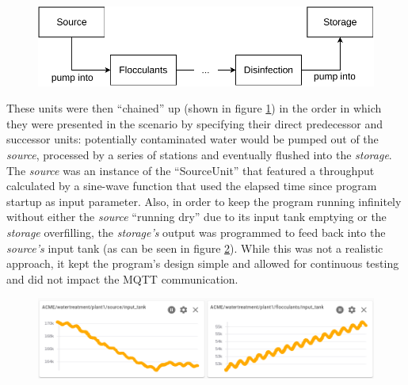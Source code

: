 \begin{figure}[h]
    \centering
    \includegraphics[width=12cm]{img/ch04/Testbed-Chain.pdf}
    \label{fig:testbed-chain}
\end{figure}
These units were then \enquote{chained} up (shown in figure \ref{fig:testbed-chain}) in the order in which they were presented in the scenario by specifying their direct predecessor and successor units: potentially contaminated water would be pumped out of the \emph{source}, processed by a series of stations and eventually flushed into the \emph{storage}. The \emph{source} was an instance of the \enquote{SourceUnit} that featured a throughput calculated by a sine-wave function that used the elapsed time since program startup as input parameter. Also, in order to keep the program running infinitely without either the \emph{source} \enquote{running dry} due to its input tank emptying or the \emph{storage} overfilling, the \emph{storage's} output was programmed to feed back into the \emph{source's} input tank (as can be seen in figure \ref{fig:mqtt-data}). While this was not a realistic approach, it kept the program's design simple and allowed for continuous testing and did not impact the \ac{MQTT} communication.

\begin{figure}[h]
    \centering
    \includegraphics[width=14cm]{img/ch04/watertreatment-mqtt-short.png}
    \label{fig:mqtt-data}
\end{figure}

